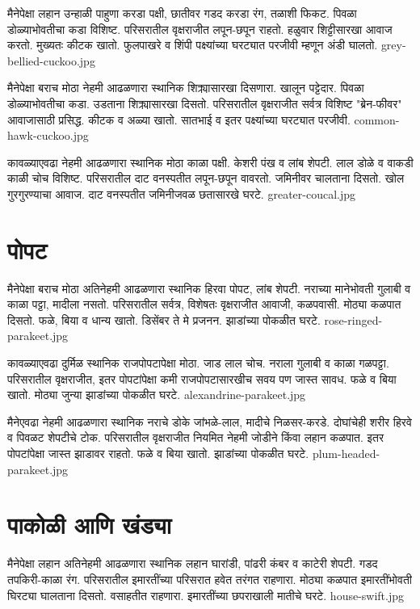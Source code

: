 \documentclass[aspectratio=169]{beamer}
\begin{document}
{मैनेपेक्षा लहान}
{उन्हाळी पाहुणा}
{करडा पक्षी, छातीवर गडद करडा रंग, तळाशी फिकट. पिवळा डोळ्याभोवतीचा कडा विशिष्ट.}
{परिसरातील वृक्षराजीत}
{लपून-छपून राहतो. हळुवार शिट्टीसारखा आवाज करतो. मुख्यतः कीटक खातो.}
{फुलपाखरे व शिंपी पक्ष्यांच्या घरट्यात परजीवी म्हणून अंडी घालतो.}
{grey-bellied-cuckoo.jpg}

{मैनेपेक्षा बराच मोठा}
{नेहमी आढळणारा स्थानिक}
{शिक्र्यासारखा दिसणारा. खालून पट्टेदार. पिवळा डोळ्याभोवतीचा कडा. उडताना शिक्र्यासारखा दिसतो.}
{परिसरातील वृक्षराजीत सर्वत्र}
{विशिष्ट "ब्रेन-फीवर" आवाजासाठी प्रसिद्ध. कीटक व अळ्या खातो.}
{सातभाई व इतर पक्ष्यांच्या घरट्यात परजीवी.}
{common-hawk-cuckoo.jpg}

{कावळ्याएवढा}
{नेहमी आढळणारा स्थानिक}
{मोठा काळा पक्षी. केशरी पंख व लांब शेपटी. लाल डोळे व वाकडी काळी चोच विशिष्ट.}
{परिसरातील दाट वनस्पतीत}
{लपून-छपून वावरतो. जमिनीवर चालताना दिसतो. खोल गुरगुरण्याचा आवाज.}
{दाट वनस्पतीत जमिनीजवळ छतासारखे घरटे.}
{greater-coucal.jpg}

\section{पोपट}
{मैनेपेक्षा बराच मोठा}
{अतिनेहमी आढळणारा स्थानिक}
{हिरवा पोपट, लांब शेपटी. नराच्या मानेभोवती गुलाबी व काळा पट्टा, मादीला नसतो.}
{परिसरातील सर्वत्र, विशेषतः वृक्षराजीत}
{आवाजी, कळपवासी. मोठ्या कळपात दिसतो. फळे, बिया व धान्य खातो.}
{डिसेंबर ते मे प्रजनन. झाडांच्या पोकळीत घरटे.}
{rose-ringed-parakeet.jpg}

{कावळ्याएवढा}
{दुर्मिळ स्थानिक}
{राजपोपटापेक्षा मोठा. जाड लाल चोच. नराला गुलाबी व काळा गळपट्टा.}
{परिसरातील वृक्षराजीत, इतर पोपटांपेक्षा कमी}
{राजपोपटासारखीच सवय पण जास्त सावध. फळे व बिया खातो.}
{मोठ्या जुन्या झाडांच्या पोकळीत घरटे.}
{alexandrine-parakeet.jpg}

{मैनेएवढा}
{नेहमी आढळणारा स्थानिक}
{नराचे डोके जांभळे-लाल, मादीचे निळसर-करडे. दोघांचेही शरीर हिरवे व पिवळट शेपटीचे टोक.}
{परिसरातील वृक्षराजीत नियमित}
{नेहमी जोडीने किंवा लहान कळपात. इतर पोपटांपेक्षा जास्त झाडावर राहतो. फळे व बिया खातो.}
{झाडांच्या पोकळीत घरटे.}
{plum-headed-parakeet.jpg}

\section{पाकोळी आणि खंड्या}
{मैनेपेक्षा लहान}
{अतिनेहमी आढळणारा स्थानिक}
{लहान घारांडी, पांढरी कंबर व काटेरी शेपटी. गडद तपकिरी-काळा रंग.}
{परिसरातील इमारतींच्या परिसरात}
{हवेत तरंगत राहणारा. मोठ्या कळपात इमारतींभोवती घिरट्या घालताना दिसतो.}
{वसाहतीत राहणारा. इमारतींच्या छपराखाली मातीचे घरटे.}
{house-swift.jpg}
\end{document}
